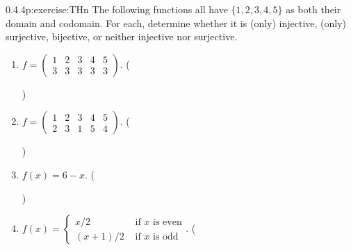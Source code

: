 \documentclass[twoside,11pt,]{book}
\numberwithin{equation}{chapter}
\newcommand{\twoline}[2]{\begin{pmatrix}#1 \\ #2 \end{pmatrix}}
\newcommand{\amp}{&}
\begin{document}
\begin{divisionsolution}{0.4.4}{}{p:exercise:THn}%
The following functions all have \(\{1,2,3,4,5\}\) as both their domain and codomain. For each, determine whether it is (only) injective, (only) surjective, bijective, or neither injective nor surjective.%
\begin{enumerate}[label=(\alph*)]
\item{}\(f = \twoline{1 \amp 2 \amp 3 \amp 4 \amp 5}{3 \amp 3 \amp 3 \amp 3 \amp 3}\text{.}\) \quad()\quad
%
\item{}\(f = \twoline{1 \amp 2 \amp 3 \amp 4 \amp 5}{2 \amp 3 \amp 1 \amp 5 \amp 4}\text{.}\) \quad()\quad
%
\item{}\(f(x) = 6 - x\text{.}\) \quad()\quad
%
\item{}\(f(x) = \begin{cases} x/2 \amp \text{ if } x \text{ is even} \\ (x+1)/2 \amp \text{ if } x \text{ is odd}\end{cases}\text{.}\) \quad(
\end{enumerate}
\end{divisionsolution}
\end{document}
